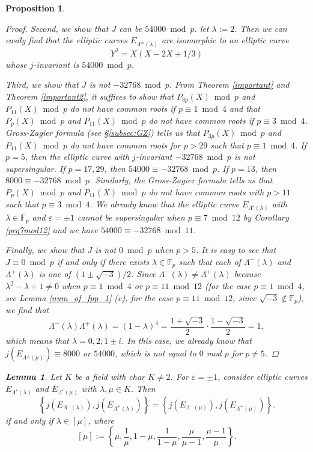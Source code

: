 \documentclass[a4paper, 11pt]{article}
\theoremstyle{plain}
\newtheorem{prop}[defn]{Proposition}
\newtheorem{lem}[defn]{Lemma}
\newcommand{\?}{\textcolor{red}{??}}
\newcommand{\lm}{\lambda}
\newcommand{\Lm}{\Lambda}
\newcommand{\fp}{\mathbb{F}_p}
\begin{document}
\begin{prop}
\begin{proof}
Second, we show that $J$ can be $54000 \bmod p$.
let $\lm:=2$. Then we can easily find that the elliptic curves $E_{\Lm^{\pm}(\lm)}$ are isomorphic to an elliptic curve
\[
Y^2=X(X-2X+1/3)
\]
whose $j$-invariant is $54000 \bmod p$.

Third, we show that $J$ is not $-32768 \bmod p$. From Theorem \ref{important} and Theorem \ref{important2}, it suffices to show that $P_{3p}(X) \bmod p $ and $P_{11}(X) \bmod p$ do not have common roots if $p \equiv 1\bmod 4$ and that $P_{p}(X) \bmod p $ and $P_{11}(X) \bmod p$ do not have  common roots if $p \equiv 3\bmod 4$. Gross-Zagier formula (see \S \ref{subsec:GZ}) tells us that $P_{3p}(X) \bmod p $ and $P_{11}(X) \bmod p$ do not have common roots for $p>29$ such that $p \equiv 1 \bmod 4$. If $p=5$, then the elliptic curve with $j$-invariant $-32768 \bmod p$ is not supersingular. If $p=17,29$, then $54000 \equiv-32768 \bmod p$. If $p=13$, then $8000 \equiv -32768 \bmod p$. Similarly, the Gross-Zagier formula tells us that $P_{p}(X) \bmod p $ and $P_{11}(X) \bmod p$ do not have common roots with $p>11$ such that $p \equiv 3 \bmod 4$. We already know that the elliptic curve $E_{\Lm^{\varepsilon}(\lm)}$ with $\lm\in\fp$ and $\varepsilon=\pm1$ cannot be supersingular when $p \equiv7 \bmod 12$ by Corollary \ref{peq7mod12} and we have $54000 \equiv -32768 \bmod 11$. 

Finally, we show that $J$ is not $0 \bmod p$ when $p>5$. It is easy to see that $J \equiv 0 \bmod p$ if and only if there exists $\lm \in \fp$ such that each of $\Lm^{-}(\lm)$ and $\Lm^{+}(\lm)$ is one of $(1\pm\sqrt{-3})/2$. Since $\Lm^{-}(\lm)\ne \Lm^{+}(\lm)$ because $\lm^2-\lm+1\ne 0$ when $p \equiv 1 \bmod4$ or $p \equiv11 \bmod 12$ (for the case $p \equiv1 \bmod 4$, see Lemma \ref{num_of_fpp_1} (c), for the case $p \equiv11 \bmod 12$, since $\sqrt{-3} \notin\fp$), we find that 
\[
\Lm^{-}(\lm) \Lm^{+}(\lm)=(1-\lm)^4=\frac{1+\sqrt{-3}}{2}\cdot \frac{1-\sqrt{-3}}{2}=1,
\]
which means that $\lm=0,2,1\pm i$. In this case, we already know that $j(E_{\Lm^{\pm}(\mu)})\equiv 8000$ or $54000$, which is not equal to $0$ mod $p$ for $p\ne 5$.  
    \end{proof}

    
    
    \begin{lem}
\label{num_iso}
    Let $K$ be a field with char $K\ne2$. For $\varepsilon=\pm1$, consider elliptic curves  $E_{\Lambda^{\varepsilon}(\lm)}$ and $E_{\Lambda^{\varepsilon}(\mu)}$ with $\lm,\mu\in K$.  Then 
    \[
    \left\{j\left(E_{\Lambda^{-}(\lm)}\right),j\left(E_{\Lambda^{+}(\lm)}\right) \right\}=\left\{j\left(E_{\Lambda^{-}(\mu)} \right),j\left(E_{\Lambda^{+}(\mu)} \right)\right \}.
    \]
    if and only if $\lm \in [\mu]$, where 
    \[
    [\mu]:=\left\{\mu, \frac{1}{\mu}, 1-\mu,\frac{1}{1-\mu}, \frac{\mu}{\mu-1},\frac{\mu-1}{\mu} \right\}.
    \]   
\end{lem}
    

\end{prop}
\end{document}
